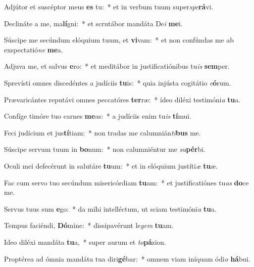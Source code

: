 \item Adjútor et suscéptor meus \textbf{es} tu:~* et in verbum tuum super\textit{spe}\textbf{rá}vi.
\item Declináte a me, ma\textbf{lí}gni:~* et scrutábor mandáta De\textit{i} \textbf{me}i.
\item Súscipe me secúndum elóquium tuum, et \textbf{vi}vam:~* et non confúndas me ab exspectatió\textit{ne} \textbf{me}a.
\item Adjuva me, et salvus \textbf{e}ro:~* et meditábor in justificatiónibus tu\textit{is} \textbf{sem}per.
\item Sprevísti omnes discedéntes a judíciis \textbf{tu}is:~* quia injústa cogitátio \textit{e}\textbf{ó}rum.
\item Prævaricántes reputávi omnes peccatóres \textbf{ter}ræ:~* ídeo diléxi testimóni\textit{a} \textbf{tu}a.
\item Confíge timóre tuo carnes \textbf{me}as:~* a judíciis enim tu\textit{is} \textbf{tí}mui.
\item Feci judícium et jus\textbf{tí}tiam:~* non tradas me calumnián\textit{ti}\textbf{bus} me.
\item Súscipe servum tuum in \textbf{bo}num:~* non calumniéntur me \textit{su}\textbf{pér}bi.
\item Oculi mei defecérunt in salutáre \textbf{tu}um:~* et in elóquium justíti\textit{æ} \textbf{tu}æ.
\item Fac cum servo tuo secúndum misericórdiam \textbf{tu}am:~* et justificatiónes tu\textit{as} \textbf{do}ce me.
\item Servus tuus sum \textbf{e}go:~* da mihi intelléctum, ut sciam testimóni\textit{a} \textbf{tu}a.
\item Tempus faciéndi, \textbf{Dó}mine:~* dissipavérunt le\textit{gem} \textbf{tu}am.
\item Ideo diléxi mandáta \textbf{tu}a,~* super aurum et \textit{to}\textbf{pá}zion.
\item Proptérea ad ómnia mandáta tua diri\textbf{gé}bar:~* omnem viam iníquam ódi\textit{o} \textbf{há}bui.
